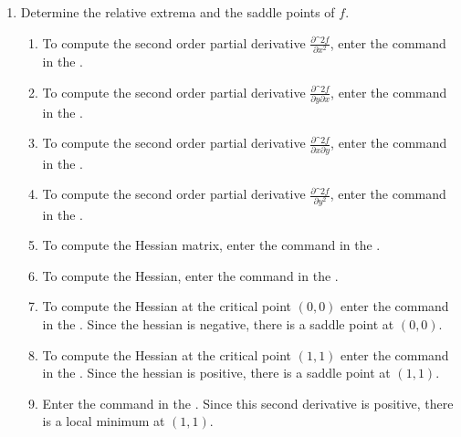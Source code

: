 \begin{enumerate}[leftmargin=*]
\begin{enumerate}
      \item Determine the relative extrema and the saddle points of $f$.
            \begin{indication}
            \begin{enumerate}
            \item To compute the second order partial derivative $\frac{\partial\^2 f}{\partial x^2}$, enter the command  in the .
            \item To compute the second order partial derivative $\frac{\partial\^2 f}{\partial y\partial x}$, enter the command  in the .
            \item To compute the second order partial derivative $\frac{\partial\^2 f}{\partial x\partial y}$, enter the command  in the .
            \item To compute the second order partial derivative $\frac{\partial\^2 f}{\partial y^2}$, enter the command  in the .
            \item To compute the Hessian matrix, enter the command  in the .
            \item To compute the Hessian, enter the command  in the .
            \item To compute the Hessian at the critical point $(0,0)$ enter the command  in the .
                  Since the hessian is negative, there is a saddle point at $(0,0)$.
            \item To compute the Hessian at the critical point $(1,1)$ enter the command  in the .
                  Since the hessian is positive, there is a saddle point at $(1,1)$.
            \item Enter the command  in the . Since this second derivative is positive, there is a local minimum at $(1,1)$.
            \end{enumerate}
            \end{indication}
      \end{enumerate}

\end{enumerate}


